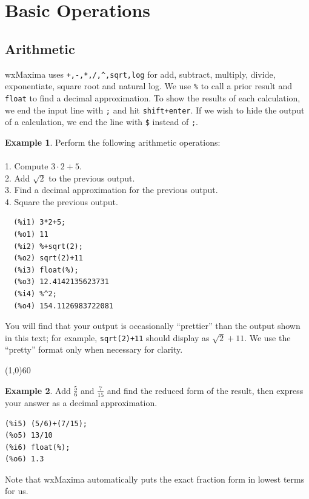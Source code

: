 \documentclass[10.5pt,twoside]{report}
\theoremstyle{definition}
\newtheorem{exmp}{Example}[section]
\begin{document}
\pagebreak


\section{Basic Operations}\label{Basic Operations}

\subsection{Arithmetic}

wxMaxima uses \verb|+,-,*,/,^,sqrt,log| for add, subtract, multiply, divide, exponentiate, square root and natural log.  We use \verb|%| to call a prior result and \verb|float| to find a decimal approximation.  To show the results of each calculation, we end the input line with \verb|;| and hit \verb|shift+enter|.  If we wish to hide the output of a calculation, we end the line with \verb|$| instead of \verb|;|.

\begin{exmp}  Perform the following arithmetic operations:\\
${}$\\



1.  Compute $3 \cdot 2 + 5$.\\
2.  Add $\sqrt{2}$ to the previous output.\\
3.  Find a decimal approximation for the previous output.\\
4.  Square the previous output.

\begin{verbatim}
  (%i1) 3*2+5;
  (%o1) 11
  (%i2) %+sqrt(2);
  (%o2) sqrt(2)+11
  (%i3) float(%);
  (%o3) 12.4142135623731
  (%i4) %^2;
  (%o4) 154.1126983722081
\end{verbatim}

You will find that your output is occasionally ``prettier'' than the output shown in this text; for example, \verb|sqrt(2)+11| should display as $\sqrt{2}+11$.  We use the ``pretty'' format only when necessary for clarity.

\end{exmp}

\line(1,0){60}
\linethickness{0.5mm}

\begin{exmp} Add $\frac{5}{6}$ and $\frac{7}{15}$ and find the reduced form of the result, then express your answer as a decimal approximation.\\


\begin{verbatim}
(%i5) (5/6)+(7/15);
(%o5) 13/10
(%i6) float(%);
(%o6) 1.3
\end{verbatim}

Note that wxMaxima automatically puts the exact fraction form in lowest terms for us.

\end{exmp}
\end{document}
